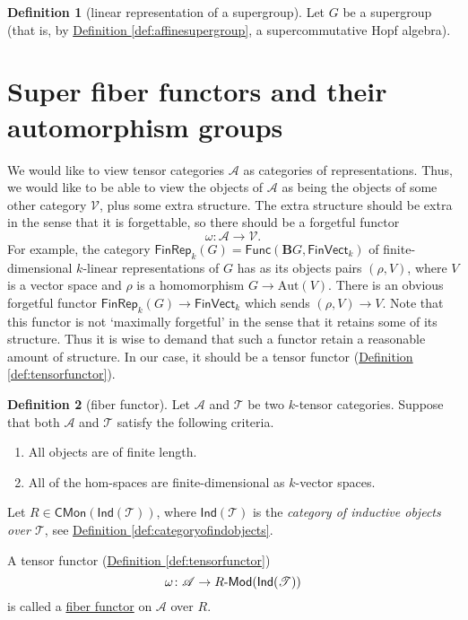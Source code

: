 \documentclass[a4paper,10pt]{scrreprt}
\newcommand{\defn}[1]{\ul{#1}}
\def\mhyp{{\hbox{-}}}
\theoremstyle{definition}
\newtheorem{definition}{Definition}[section]
\theoremstyle{plain}
\theoremstyle{remark}
\begin{document}
\begin{definition}[linear representation of a supergroup]
  \label{def:linearrepresentationofsupergroup}
  Let $G$ be a supergroup (that is, by \hyperref[def:affinesupergroup]{Definition \ref*{def:affinesupergroup}}, a supercommutative Hopf algebra).
\end{definition}

\section{Super fiber functors and their automorphism groups}
We would like to view tensor categories $\mathscr{A}$ as categories of representations. Thus, we would like to be able to view the objects of $\mathscr{A}$ as being the objects of some other category $\mathscr{V}$, plus some extra structure. The extra structure should be extra in the sense that it is forgettable, so there should be a forgetful functor
\begin{equation*}
  \omega\colon \mathscr{A} \rightarrow \mathscr{V}.
\end{equation*}
For example, the category $\mathsf{FinRep}_{k}(G) = \mathsf{Func}(\mathbf{B}G, \mathsf{FinVect}_{k})$ of finite-dimensional $k$-linear representations of $G$ has as its objects pairs $(\rho, V)$, where $V$ is a vector space and $\rho$ is a homomorphism $G \to \mathrm{Aut}(V)$. There is an obvious forgetful functor $\mathsf{FinRep}_{k}(G) \to \mathsf{FinVect}_{k}$ which sends $(\rho, V) \to V$. Note that this functor is not `maximally forgetful' in the sense that it retains some of its structure. Thus it is wise to demand that such a functor retain a reasonable amount of structure. In our case, it should be a tensor functor (\hyperref[def:tensorfunctor]{Definition \ref*{def:tensorfunctor}}).

\begin{definition}[fiber functor]
  \label{def:fiberfunctor}
  Let $\mathscr{A}$ and $\mathscr{T}$ be two $k$-tensor categories. Suppose that both $\mathscr{A}$ and $\mathscr{T}$ satisfy the following criteria.
  \begin{enumerate}
    \item All objects are of finite length.

    \item All of the hom-spaces are finite-dimensional as $k$-vector spaces.
  \end{enumerate}

  Let $R \in \mathsf{CMon}(\mathsf{Ind}(\mathscr{T}))$, where $\mathsf{Ind}(\mathscr{T})$ is the \emph{category of inductive objects over $\mathscr{T}$}, see \hyperref[def:categoryofindobjects]{Definition \ref*{def:categoryofindobjects}}.

  A tensor functor (\hyperref[def:tensorfunctor]{Definition \ref*{def:tensorfunctor}})
  \begin{equation*}
    \omega\colon \mathscr{A} \to R\mhyp\mathsf{Mod}(\mathsf{Ind}(\mathscr{T}))
  \end{equation*}
  is called a \defn{fiber functor} on $\mathscr{A}$ over $R$.
\end{definition}
\end{document}
